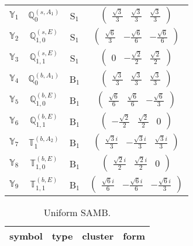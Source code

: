 \documentclass[fleqn,10pt,landscape]{article}
\begin{document}
\begin{itemize}
\begin{center}
\begin{longtable}{c|c|c|c}
$ \mathbb{Y}_{1} $ & $\mathbb{Q}_{0}^{(s,A_{1})}$ & S$_{1}$ & $\begin{pmatrix} \frac{\sqrt{3}}{3} & \frac{\sqrt{3}}{3} & \frac{\sqrt{3}}{3} \end{pmatrix}$ \\
$ \mathbb{Y}_{2} $ & $\mathbb{Q}_{1,0}^{(s,E)}$ & S$_{1}$ & $\begin{pmatrix} \frac{\sqrt{6}}{3} & - \frac{\sqrt{6}}{6} & - \frac{\sqrt{6}}{6} \end{pmatrix}$ \\
$ \mathbb{Y}_{3} $ & $\mathbb{Q}_{1,1}^{(s,E)}$ & S$_{1}$ & $\begin{pmatrix} 0 & - \frac{\sqrt{2}}{2} & \frac{\sqrt{2}}{2} \end{pmatrix}$ \\ \hline
$ \mathbb{Y}_{4} $ & $\mathbb{Q}_{0}^{(b,A_{1})}$ & B$_{1}$ & $\begin{pmatrix} \frac{\sqrt{3}}{3} & \frac{\sqrt{3}}{3} & \frac{\sqrt{3}}{3} \end{pmatrix}$ \\
$ \mathbb{Y}_{5} $ & $\mathbb{Q}_{1,0}^{(b,E)}$ & B$_{1}$ & $\begin{pmatrix} \frac{\sqrt{6}}{6} & \frac{\sqrt{6}}{6} & - \frac{\sqrt{6}}{3} \end{pmatrix}$ \\
$ \mathbb{Y}_{6} $ & $\mathbb{Q}_{1,1}^{(b,E)}$ & B$_{1}$ & $\begin{pmatrix} - \frac{\sqrt{2}}{2} & \frac{\sqrt{2}}{2} & 0 \end{pmatrix}$ \\
$ \mathbb{Y}_{7} $ & $\mathbb{T}_{1}^{(b,A_{2})}$ & B$_{1}$ & $\begin{pmatrix} \frac{\sqrt{3} i}{3} & - \frac{\sqrt{3} i}{3} & \frac{\sqrt{3} i}{3} \end{pmatrix}$ \\
$ \mathbb{Y}_{8} $ & $\mathbb{T}_{1,0}^{(b,E)}$ & B$_{1}$ & $\begin{pmatrix} \frac{\sqrt{2} i}{2} & \frac{\sqrt{2} i}{2} & 0 \end{pmatrix}$ \\
$ \mathbb{Y}_{9} $ & $\mathbb{T}_{1,1}^{(b,E)}$ & B$_{1}$ & $\begin{pmatrix} \frac{\sqrt{6} i}{6} & - \frac{\sqrt{6} i}{6} & - \frac{\sqrt{6} i}{3} \end{pmatrix}$ \\
\end{longtable}
\end{center}
\begin{center}
\renewcommand{\arraystretch}{1.3}
\begin{longtable}{c|c|c|c}
\caption{Uniform SAMB.}
 \\
 \hline \hline
symbol & type & cluster & form \\ \hline \endfirsthead


\end{longtable}
\end{center}
\end{itemize}
\end{document}
